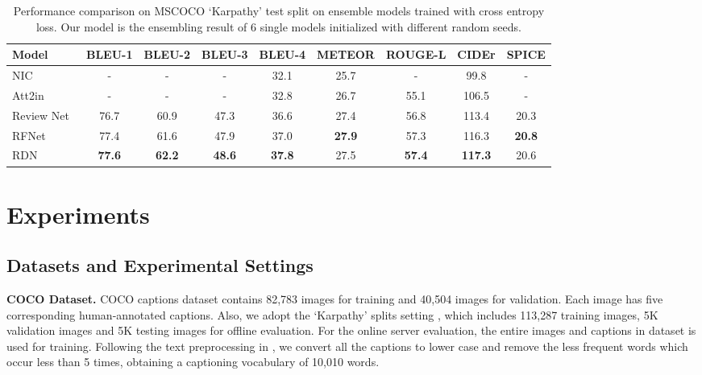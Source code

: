 \documentclass[10pt,twocolumn,letterpaper]{article}
\begin{document}
\begin{table*}[!t]
	\centering
	\tabcolsep=0.15cm
	\renewcommand{\arraystretch}{0.9}
	{\small
		\begin{tabular}{ l | c c c c c c c c }
			\toprule
			Model & BLEU-1 & BLEU-2  & BLEU-3  & BLEU-4  & METEOR & ROUGE-L & CIDEr & SPICE \\
			\midrule
NIC~\cite{vinyals2015showtell} & - & - & - & 32.1  & 25.7 & - & 99.8 & - \\
			Att2in~\cite{rennie2017self}  & - & - & - & 32.8  & 26.7 & 55.1 & 106.5 & - \\
			Review Net~\cite{yang2016review}  & 76.7 & 60.9 & 47.3 & 36.6  & 27.4 & 56.8 & 113.4 & 20.3 \\
			RFNet~\cite{jiang2018recurrent}  & 77.4 & 61.6 & 47.9 & 37.0  & \textbf{27.9} & 57.3 & 116.3 & \textbf{20.8} \\
			\midrule
			RDN & \textbf{77.6} & \textbf{62.2} & \textbf{48.6} & \textbf{37.8}  & 27.5 & \textbf{57.4} & \textbf{117.3} & 20.6 \\
			\bottomrule
		\end{tabular}
	}
	\vspace{0.1cm}
	\caption {Performance comparison on MSCOCO `Karpathy' test split on ensemble models trained with cross entropy loss. Our model is the ensembling result of 6 single models initialized with different random seeds.
	}
	\vspace{-0.1in}
	\label{table:ensemble}
\end{table*}




 

\section{Experiments}
\vspace{1mm}
\subsection{Datasets and Experimental Settings}

\smallskip\noindent\textbf{COCO Dataset.}
COCO captions dataset \cite{chen2015microsoft}  contains 82,783 images for training and 40,504 images for validation.
Each image has five corresponding human-annotated captions.
Also, we adopt the `Karpathy' splits setting \cite{karpathy2015deep}, which includes 113,287 training images, 5K validation images and 5K testing images for offline evaluation.
For the online server evaluation, the entire images and captions in dataset is used for training.
Following the text preprocessing in \cite{anderson2017bottom}, we convert all the captions to lower case and remove the less frequent words which occur less than 5 times, obtaining a captioning vocabulary of 10,010 words.
\end{document}
